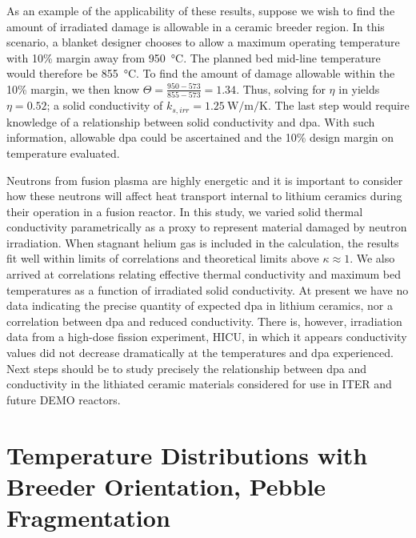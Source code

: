 As an example of the applicability of these results, suppose we wish to find the amount of irradiated damage is allowable in a ceramic breeder region. In this scenario, a blanket designer chooses to allow a maximum operating temperature with 10\% margin away from \SI{950}{\celsius}. The planned bed mid-line temperature would therefore be \SI{855}{\celsius}. To find the amount of damage allowable within the 10\% margin, we then know $\Theta = \frac{950-573}{855-573} = 1.34$. Thus, solving for $\eta$ in  yields $\eta = 0.52$; a solid conductivity of $k_{s,irr} = \SI{1.25}{\watt\per\meter\per\kelvin}$. The last step would require knowledge of a relationship between solid conductivity and dpa. With such information, allowable dpa could be ascertained and the 10\% design margin on temperature evaluated.





Neutrons from fusion plasma are highly energetic and it is important to consider how these neutrons will affect heat transport internal to lithium ceramics during their operation in a fusion reactor. In this study, we varied solid thermal conductivity parametrically as a proxy to represent material damaged by neutron irradiation. When stagnant helium gas is included in the calculation, the results fit well within limits of correlations and theoretical limits above $\kappa \approx 1$. We also arrived at correlations relating effective thermal conductivity and maximum bed temperatures as a function of irradiated solid conductivity. At present we have no data indicating the precise quantity of expected dpa in lithium ceramics, nor a correlation between dpa and reduced conductivity. There is, however, irradiation data from a high-dose fission experiment, HICU, in which it appears conductivity values did not decrease dramatically at the temperatures and dpa experienced. Next steps should be to study precisely the relationship between dpa and conductivity in the lithiated ceramic materials considered for use in ITER and future DEMO reactors.

\FloatBarrier












\section{Temperature Distributions with Breeder Orientation, Pebble Fragmentation}\label{sec:isfnt-12}


